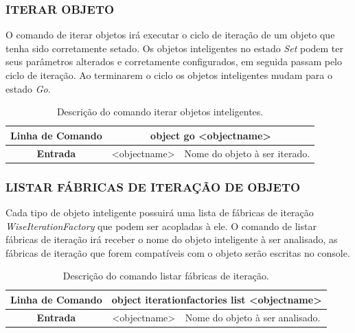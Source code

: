 \documentclass[a4paper,12pt]{monografia}
\theoremstyle{plain}
\theoremstyle{definition}
\theoremstyle{remark}
\begin{document}
\subsubsection{ITERAR OBJETO}\label{sec:go_object}

O comando de iterar objetos irá executar o ciclo de iteração de um objeto que tenha sido corretamente setado. Os objetos inteligentes no estado \textit{Set} podem ter seus parâmetros alterados e corretamente configurados, em seguida passam pelo ciclo de iteração. Ao terminarem o ciclo os objetos inteligentes mudam para o estado \textit{Go}.

\begin{center}
	\begin{table}[!htbp]
		\begin{tabular}{|c|c|m{}|}
			\hline
			\textbf{Linha de Comando} & \multicolumn{2}{c|}{object go <object\underline{\space\space}name>} \\
			\hline
			\textbf{Entrada} & <object\underline{\space\space}name> & Nome do objeto à ser iterado. \\
			\hline
		\end{tabular}
		\caption{Descrição do comando iterar objetos inteligentes.}
		\label{tab:go_objectject}
	\end{table}
\end{center}

\subsubsection{LISTAR FÁBRICAS DE ITERAÇÃO DE OBJETO}\label{sec:iteration_factories_list}

Cada tipo de objeto inteligente possuirá uma lista de fábricas de iteração \textit{WiseIterationFactory} que podem ser acopladas à ele. O comando de listar fábricas de iteração irá receber o nome do objeto inteligente à ser analisado, as fábricas de iteração que forem compatíveis com o objeto serão escritas no console.

\begin{center}
	\begin{table}[!htbp]
		\begin{tabular}{|c|c|m{}|}
			\hline
			\textbf{Linha de Comando} & \multicolumn{2}{c|}{object iteration\underline{\space\space}factories list <object\underline{\space\space}name>} \\
			\hline
			\textbf{Entrada} & <object\underline{\space\space}name> & Nome do objeto à ser analisado. \\
			\hline
		\end{tabular}
		\caption{Descrição do comando listar fábricas de iteração.}
		\label{tab:iteration_factories_list}
	\end{table}
\end{center}
\end{document}
